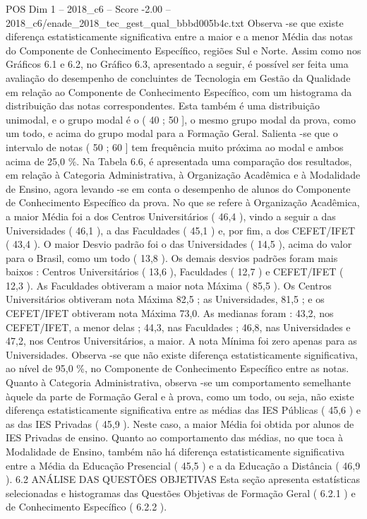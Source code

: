 \begin{textsample}{POS Dim 1 – 2018\_c6 – Score -2.00 – 2018\_c6/enade\_2018\_tec\_gest\_qual\_bbbd005b4c.txt}
Observa -se que existe diferença estatisticamente significativa entre a maior e a menor Média das notas do Componente de Conhecimento Específico, regiões Sul e Norte.
Assim como nos Gráficos 6.1 e 6.2, no Gráfico 6.3, apresentado a seguir, é possível ser feita uma avaliação do desempenho de concluintes de Tecnologia em Gestão da Qualidade em relação ao Componente de Conhecimento Específico, com um histograma da distribuição das notas correspondentes.
Esta também é uma distribuição unimodal, e o grupo modal é o ( 40 ; 50 ], o mesmo grupo modal da prova, como um todo, e acima do grupo modal para a Formação Geral.
Salienta -se que o intervalo de notas ( 50 ; 60 ] tem frequência muito próxima ao modal e ambos acima de 25,0 \%.
Na Tabela 6.6, é apresentada uma comparação dos resultados, em relação à Categoria Administrativa, à Organização Acadêmica e à Modalidade de Ensino, agora levando -se em conta o desempenho de alunos do Componente de Conhecimento Específico da prova.
No que se refere à Organização Acadêmica, a maior Média foi a dos Centros Universitários ( 46,4 ), vindo a seguir a das Universidades ( 46,1 ), a das Faculdades ( 45,1 ) e, por fim, a dos CEFET/IFET ( 43,4 ).
O maior Desvio padrão foi o das Universidades ( 14,5 ), acima do valor para o Brasil, como um todo ( 13,8 ).
Os demais desvios padrões foram mais baixos : Centros Universitários ( 13,6 ), Faculdades ( 12,7 ) e CEFET/IFET ( 12,3 ).
As Faculdades obtiveram a maior nota Máxima ( 85,5 ).
Os Centros Universitários obtiveram nota Máxima 82,5 ; as Universidades, 81,5 ; e os CEFET/IFET obtiveram nota Máxima 73,0.
As medianas foram : 43,2, nos CEFET/IFET, a menor delas ; 44,3, nas Faculdades ; 46,8, nas Universidades e 47,2, nos Centros Universitários, a maior.
A nota Mínima foi zero apenas para as Universidades.
Observa -se que não existe diferença estatisticamente significativa, ao nível de 95,0 \%, no Componente de Conhecimento Específico entre as notas.
Quanto à Categoria Administrativa, observa -se um comportamento semelhante àquele da parte de Formação Geral e à prova, como um todo, ou seja, não existe diferença estatisticamente significativa entre as médias das IES Públicas ( 45,6 ) e as das IES Privadas ( 45,9 ).
Neste caso, a maior Média foi obtida por alunos de IES Privadas de ensino.
Quanto ao comportamento das médias, no que toca à Modalidade de Ensino, também não há diferença estatisticamente significativa entre a Média da Educação Presencial ( 45,5 ) e a da Educação a Distância ( 46,9 ). 6.2 ANÁLISE DAS QUESTÕES OBJETIVAS Esta seção apresenta estatísticas selecionadas e histogramas das Questões Objetivas de Formação Geral ( 6.2.1 ) e de Conhecimento Específico ( 6.2.2 ).

\end{textsample}
